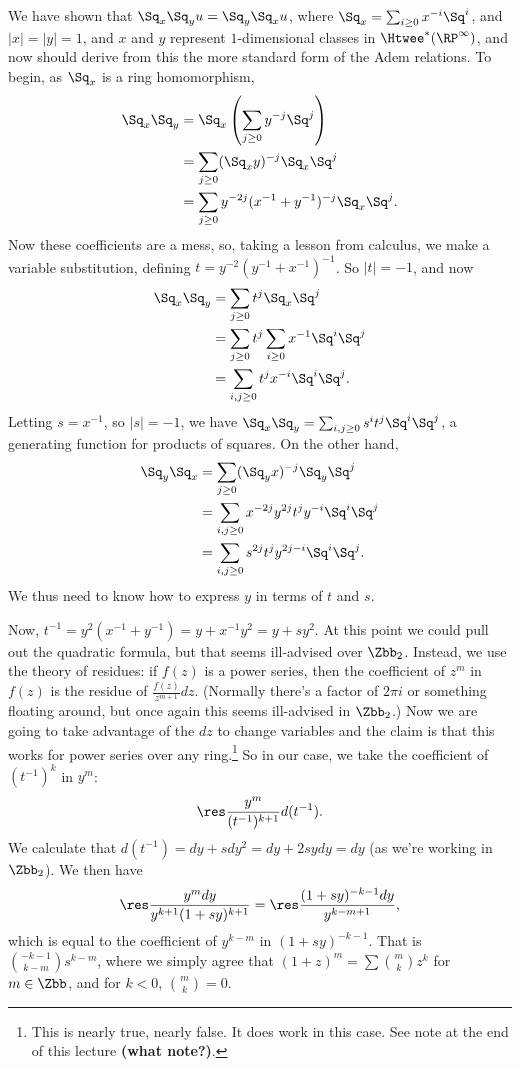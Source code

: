 We have shown that $\Sq_x \Sq_y u = \Sq_y \Sq_x u$, where $\Sq_x = \sum_{i \ge 0} x^{-i} \Sq^i$, and $|x| = |y| = 1$, and $x$ and $y$ represent $1$-dimensional classes in $\Htwee^* (\RP^\infty)$, and now should derive from this the more standard form of the Adem relations. To begin, as $\Sq_x$ is a ring homomorphism,
\begin{align*}
\Sq_x \Sq_y & = \Sq_x \left( \sum_{j \ge 0} y^{-j} \Sq^j \right) \\
& = \sum_{j \ge 0}(\Sq_x y)^{-j} \Sq_x \Sq^j \\
& = \sum_{j \ge 0} y^{-2j}(x^{-1} + y^{-1})^{-j} \Sq_x \Sq^j.
\end{align*}
Now these coefficients are a mess, so, taking a lesson from calculus, we make a variable substitution, defining $t = y^{-2}(y^{-1} + x^{-1})^{-1}$.  So $|t| = -1$, and now
\begin{align*}
\Sq_x \Sq_y & = \sum_{j \ge 0} t^j \Sq_x \Sq^j \\
& = \sum_{j \ge 0} t^j \sum_{i \ge 0} x^{-1} \Sq^i \Sq^j \\
& = \sum_{i, j \ge 0} t^j x^{-i} \Sq^i \Sq^j.
\end{align*}
Letting $s = x^{-1}$, so $|s| = -1$, we have $\Sq_x \Sq_y = \sum_{i, j \ge 0} s^i t^j \Sq^i \Sq^j$, a generating function for products of squares.  On the other hand,
\begin{align*}
\Sq_y \Sq_x & = \sum_{j \ge 0}(\Sq_y x)^{-j} \Sq_y \Sq^j \\
& = \sum_{i, j \ge 0} x^{-2j} y^{2j} t^j y^{-i} \Sq^i \Sq^j \\
& = \sum_{i, j \ge 0} s^{2j} t^j y^{2j-i} \Sq^i \Sq^j.
\end{align*}
We thus need to know how to express $y$ in terms of $t$ and $s$.

Now, $t^{-1} = y^2(x^{-1} + y^{-1}) = y + x^{-1} y^2 = y + s y^2$.  At this point we could pull out the quadratic formula, but that seems ill-advised over $\Zbb_2$.  Instead, we use the theory of residues: if $f(z)$ is a power series, then the coefficient of $z^m$ in $f(z)$ is the residue of $\frac{f(z)}{z^{m+1}}dz$.  (Normally there's a factor of $2 \pi i$ or something floating around, but once again this seems ill-advised in $\Zbb_2$.)  Now we are going to take advantage of the $dz$ to change variables and the claim is that this works for power series over any ring.\footnote{This is nearly true, nearly false.  It does work in this case.  See note at the end of this lecture \textbf{(what note?)}. %
}  So in our case, we take the coefficient of $(t^{-1})^k$ in $y^m$: \[\res \frac{y^m}{(t^{-1})^{k+1}} d(t^{-1}).\]  We calculate that $d(t^{-1}) = dy + sdy^2 = dy + 2sydy = dy$ (as we're working in $\Zbb_2$).  We then have
\[\res \frac{y^m dy}{y^{k+1}(1 + sy)^{k+1}} = \res \frac{(1+sy)^{-k-1} dy}{y^{k-m+1}},\]
which is equal to the coefficient of $y^{k-m}$ in $(1+sy)^{-k-1}$. That is $\binom{-k-1}{k-m}s^{k-m}$, where we simply agree that $(1 + z)^m = \sum \binom{m}{k} z^k$ for $m \in \Zbb$, and for $k < 0$, $\binom{m}{k} = 0$.

